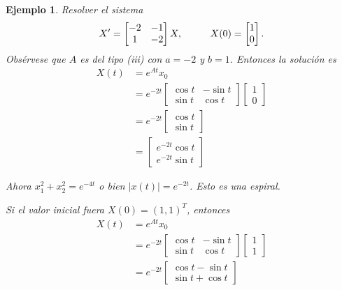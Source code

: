 \documentclass[11pt,letterpaper,draft]{report}
\newtheorem{exa}{Ejemplo}
\newcommand\<{\langle}
\renewcommand\>{\rangle}
\begin{document}
\begin{exa}
  Resolver el sistema
  \[
    X' =
    \begin{bmatrix}
      -2 & -1 \\ 1 & -2
    \end{bmatrix}
    X,
    \hspace{10mm}
    X(0)
    =
    \begin{bmatrix}
      1 \\ 0
    \end{bmatrix}
  .\]
Obsérvese que $A$ es del tipo (iii) con $a=-2$ y $b=1$.
Entonces la solución es
\begin{align*}
  X(t)
  &= e^{At}x_0 \\
  &= e^{-2t}
  \begin{bmatrix}
    \cos t & -\sin t \\ \sin t & \cos t
  \end{bmatrix}
  \begin{bmatrix}
    1 \\ 0
  \end{bmatrix} \\
  &= e^{-2t}
  \begin{bmatrix}
    \cos t \\ \sin t
  \end{bmatrix} \\
  &= 
  \begin{bmatrix}
    e^{-2t}\cos t \\ e^{-2t}\sin t
  \end{bmatrix}
\end{align*}


Ahora $x_1^2+x_2^2=e^{-4t}$ o bien $|x(t)|=e^{-2t}$.
Esto es una espiral.

Si el valor inicial fuera $X(0)=(1,1)^T$, entonces
\begin{align*}
  X(t)
  &= e^{At}x_0 \\
  &= e^{-2t}
  \begin{bmatrix}
    \cos t & -\sin t \\ \sin t & \cos t
  \end{bmatrix}
  \begin{bmatrix}
    1 \\ 1
  \end{bmatrix} \\
  &= e^{-2t}
  \begin{bmatrix}
    \cos t - \sin t \\ \sin t + \cos t
  \end{bmatrix}
\end{align*}
\end{exa}
\end{document}
